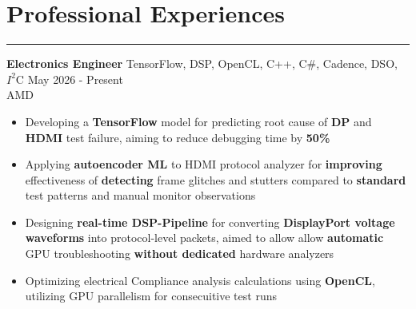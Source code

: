 \documentclass[10pt]{article}
\newcommand{\MHtLsep}{-0.7em}
\newcommand{\LtHsep}{0.9em}
\begin{document}

\newcommand{\WEVBsep}{0.0em}

\newcommand{\WStWSsep}{-1.15em}

\newcommand{\TtCsep}{0.15em}

\newcommand{\CtPsep}{-1.55em}

\newcommand{\PtPsep}{-1.7em}

\newcommand{\PTtPsep}{-1.7em}

\newcommand{\PStPSsep}{-1.15em}

\section*{\large {Professional Experiences}} \vspace{\MHtLsep} \hrule 
\vspace{\LtHsep}

\textbf{Electronics Engineer} \hspace{\WEVBsep}\textbar\hspace{\WEVBsep} TensorFlow, DSP, OpenCL, C++, C\#, Cadence, DSO, $I^{2}$C \hfill May 2026 - Present \\[\TtCsep]
AMD \\[\CtPsep]
\begin{itemize}
    \item Developing a \textbf{TensorFlow} model for predicting root cause of \textbf{\small DP} and \textbf{\small HDMI} test failure, aiming to reduce debugging time by \textbf{50\%}\\[\PtPsep]
    \item Applying \textbf{autoencoder ML} to HDMI protocol analyzer for \textbf{improving} effectiveness of \textbf{detecting} frame glitches and stutters compared to \textbf{standard} test patterns and manual monitor observations\\[\PtPsep]
    \item Designing \textbf{real-time DSP-Pipeline} for converting \textbf{DisplayPort voltage waveforms} into protocol-level packets, aimed to allow allow \textbf{automatic} GPU troubleshooting \textbf{without dedicated} hardware analyzers\\[\PtPsep]
    \item Optimizing electrical Compliance analysis calculations using \textbf{OpenCL}, utilizing GPU parallelism for consecuitive test runs\\[\WStWSsep]
    
\end{itemize} 
\end{document}
